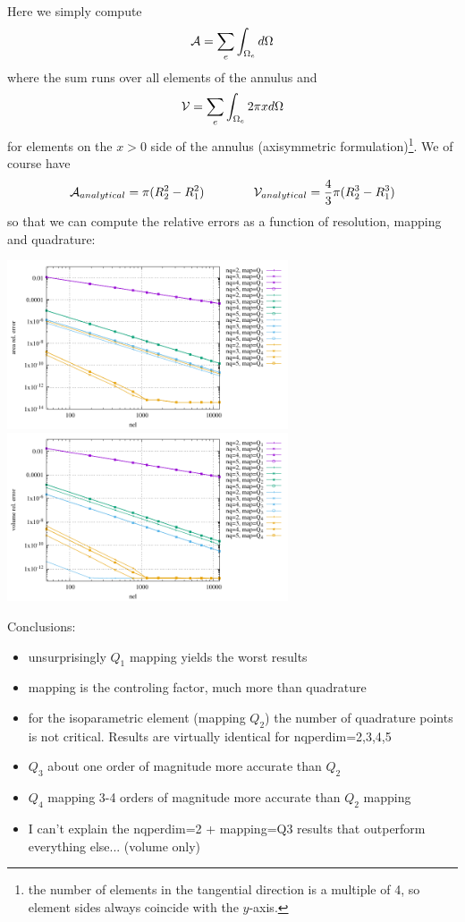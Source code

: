 Here we simply compute 
\[
{\cal A} = \sum_e \int_{\Omega_e} d\Omega
\]
where the sum runs over all elements of the annulus
and 
\[
{\cal V} = \sum_e \int_{\Omega_e} 2\pi x d\Omega
\]
for elements on the $x>0$ side of the annulus (axisymmetric formulation)\footnote{the number of elements in the 
tangential direction is a multiple of 4, so element sides always coincide with the $y$-axis.}.
We of course have 
\[
{\cal A}_{analytical} = \pi (R_2^2-R_1^2)
\qquad\qquad
{\cal V}_{analytical} = \frac43 \pi (R_2^3-R_1^3)
\]
so that we can compute the relative errors as a function of resolution, mapping and quadrature: 
\begin{center}
\includegraphics[width=8.3cm]{python_codes/fieldstone_152/results/areas/areas.pdf}
\includegraphics[width=8.3cm]{python_codes/fieldstone_152/results/areas/volumes.pdf}
\end{center}

\noindent Conclusions:
\begin{itemize}
\item unsurprisingly $Q_1$ mapping yields the worst results
\item mapping is the controling factor, much more than quadrature
\item for the isoparametric element (mapping $Q_2$) the number of quadrature points 
is not critical. Results are virtually identical for {\python nqperdim=2,3,4,5}
\item $Q_3$ about one order of magnitude more accurate than $Q_2$ 
\item $Q_4$ mapping 3-4 orders of magnitude more accurate than $Q_2$ mapping
\item I can't explain the {\python nqperdim=2 + mapping=Q3} results that outperform everything else... (volume only)
\end{itemize}


